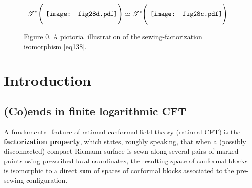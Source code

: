 \documentclass[11pt,b5paper,notitlepage]{article}
\theoremstyle{definition}
\theoremstyle{plain}
\newcommand{\<}{\left\langle}
\renewcommand{\>}{\right\rangle}
\newcommand{\ST}{\mathscr{T}}
\numberwithin{equation}{section}
\begin{document}
\hypertarget{figsfend}{}
\begin{figure}[H]
	\centering
\begin{gather*}
\ST^*\Bigg(\vcenter{\hbox{{
		\texttt{[image: fig28d.pdf]}}}}\Bigg)\simeq\ST^*\Bigg(\vcenter{\hbox{{
		\texttt{[image: fig28c.pdf]}}}}\Bigg)
   \end{gather*}
\caption*{Figure 0. A pictorial illustration of the sewing-factorization isomorphism \eqref{eq138}.}
\end{figure}
\tableofcontents




	
	
	
	

	
	

	
	
	
	
	
	
	
	
	



\section{Introduction}



\subsection{(Co)ends in finite logarithmic CFT}

\nocite{HLZ1,HLZ2,HLZ3,HLZ4,HLZ5,HLZ6,HLZ7,HLZ8}

A fundamental feature of rational conformal field theory (rational CFT) is the \textbf{factorization property}, which states, roughly speaking, that when a (possibly disconnected) compact Riemann surface is sewn along several pairs of marked points using prescribed local coordinates, the resulting space of conformal blocks is isomorphic to a direct sum of spaces of conformal blocks associated to the pre-sewing configuration. 
\end{document}
